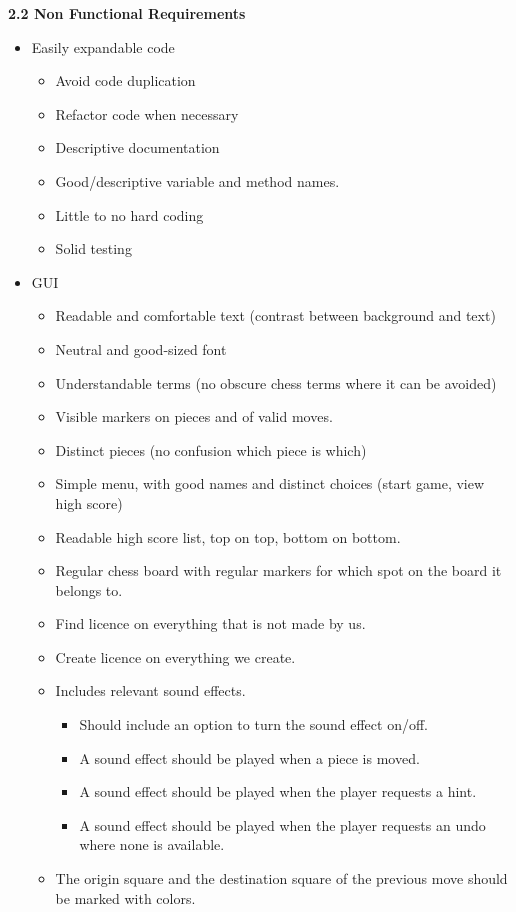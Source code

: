\documentclass{article}
\begin{document}
\begin{flushleft}
\textbf{2.2	Non Functional Requirements}
\begin{itemize}
	\item Easily expandable code
	\begin{itemize}
		\item Avoid code duplication
		\item Refactor code when necessary 
		\item Descriptive documentation
		\item Good/descriptive variable and method names.
		\item Little to no hard coding
		\item Solid testing
	\end{itemize}
	\item GUI
	\begin{itemize}
		\item Readable and comfortable text (contrast between background and text)
		\item Neutral and good-sized font
		\item Understandable terms (no obscure chess terms where it can be avoided)
		\item Visible markers on pieces and of valid moves.
		\item Distinct pieces (no confusion which piece is which)
		\item Simple menu, with good names and distinct choices (start game, view high score)
		\item Readable high score list, top on top, bottom on bottom.
		\item Regular chess board with regular markers for which spot on the board it belongs to.
		\item Find licence on everything that is not made by us.
		\item Create licence on everything we create.
		\item Includes relevant sound effects.
		\begin{itemize}
			\item Should include an option to turn the sound effect on/off.
			\item  A sound effect should be played when a piece is moved. 
			\item A sound effect should be played when the player requests a hint.
			\item A sound effect should be played when the player requests an undo where none is available.
		\end{itemize}
		\item The origin square and the destination square of the previous move should be marked with colors.

\end{itemize}
\end{itemize}
\end{flushleft}
\end{document}
